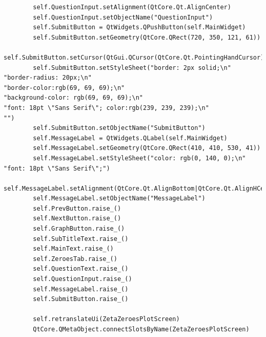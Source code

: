 \documentclass{article}
\begin{document}
\begin{lstlisting}
        self.QuestionInput.setAlignment(QtCore.Qt.AlignCenter)
        self.QuestionInput.setObjectName("QuestionInput")
        self.SubmitButton = QtWidgets.QPushButton(self.MainWidget)
        self.SubmitButton.setGeometry(QtCore.QRect(720, 350, 121, 61))
        self.SubmitButton.setCursor(QtGui.QCursor(QtCore.Qt.PointingHandCursor))
        self.SubmitButton.setStyleSheet("border: 2px solid;\n"
"border-radius: 20px;\n"
"border-color:rgb(69, 69, 69);\n"
"background-color: rgb(69, 69, 69);\n"
"font: 18pt \"Sans Serif\"; color:rgb(239, 239, 239);\n"
"")
        self.SubmitButton.setObjectName("SubmitButton")
        self.MessageLabel = QtWidgets.QLabel(self.MainWidget)
        self.MessageLabel.setGeometry(QtCore.QRect(410, 410, 530, 41))
        self.MessageLabel.setStyleSheet("color: rgb(0, 140, 0);\n"
"font: 18pt \"Sans Serif\";")
        self.MessageLabel.setAlignment(QtCore.Qt.AlignBottom|QtCore.Qt.AlignHCenter)
        self.MessageLabel.setObjectName("MessageLabel")
        self.PrevButton.raise_()
        self.NextButton.raise_()
        self.GraphButton.raise_()
        self.SubTitleText.raise_()
        self.MainText.raise_()
        self.ZeroesTab.raise_()
        self.QuestionText.raise_()
        self.QuestionInput.raise_()
        self.MessageLabel.raise_()
        self.SubmitButton.raise_()

        self.retranslateUi(ZetaZeroesPlotScreen)
        QtCore.QMetaObject.connectSlotsByName(ZetaZeroesPlotScreen)


\end{lstlisting}
\end{document}
